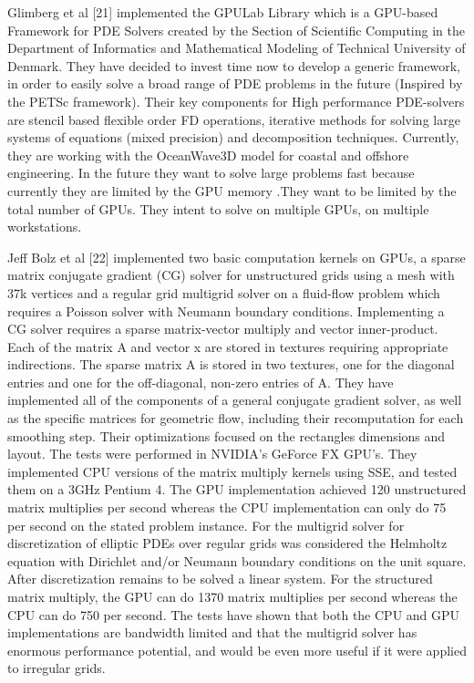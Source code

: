 Glimberg et al [21] implemented the GPULab Library which is a GPU-based Framework for PDE Solvers created by the Section of Scientific Computing in the Department of Informatics and Mathematical Modeling of Technical University of Denmark. They have decided to invest time now to develop a generic framework, in order to easily solve a broad range of PDE problems in the future (Inspired by the PETSc framework). Their key components for High performance PDE-solvers are stencil based flexible order FD operations, iterative methods for solving large systems of equations (mixed precision) and decomposition techniques. Currently, they are working with the OceanWave3D model for coastal and offshore engineering. In the future they want to solve large problems fast because currently they are limited by the GPU memory .They want to be limited by the total number of GPUs. They intent to solve on multiple GPUs, on multiple workstations. 

Jeff Bolz et al [22] implemented two basic computation kernels on GPUs, a sparse matrix conjugate gradient (CG) solver for unstructured grids using a mesh with 37k vertices and a regular grid multigrid solver on a fluid-flow problem which requires a Poisson solver with Neumann boundary conditions. Implementing a CG solver requires a sparse matrix-vector multiply and vector inner-product. Each of the matrix A and vector x are stored in textures requiring appropriate indirections. The sparse matrix A is stored in two textures, one for the diagonal entries and one for the off-diagonal, non-zero entries of A. They have implemented all of the components of a general conjugate gradient solver, as well as the specific matrices for geometric flow, including their recomputation for each smoothing step. Their optimizations focused on the rectangles dimensions and layout. The tests were performed in NVIDIA's GeForce FX GPU's. They implemented CPU versions of the matrix multiply kernels using SSE, and tested them on a 3GHz Pentium 4. The GPU implementation achieved 120 unstructured matrix multiplies per second whereas the CPU implementation can only do 75 per second on the stated problem instance. For the multigrid solver for discretization of elliptic PDEs over regular grids was considered the Helmholtz equation with Dirichlet and/or Neumann boundary conditions on the unit square. After discretization remains to be solved a linear system. For the structured matrix multiply, the GPU can do 1370 matrix multiplies per second whereas the CPU can do 750 per second. The tests have shown that both the CPU and GPU implementations are bandwidth limited and that the multigrid solver has enormous performance potential, and would be even more useful if it were applied to irregular grids.

